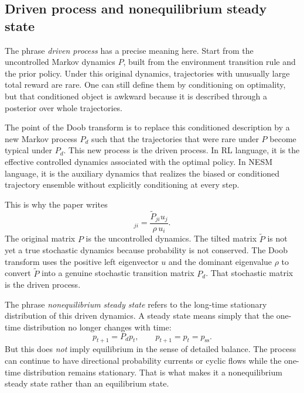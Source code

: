 \documentclass[11pt]{article}
\begin{document}
\subsection*{Driven process and nonequilibrium steady state}

The phrase \emph{driven process} has a precise meaning here. Start from the uncontrolled Markov
dynamics \(P\), built from the environment transition rule and the prior policy. Under this
original dynamics, trajectories with unusually large total reward are rare. One can still define
them by conditioning on optimality, but that conditioned object is awkward because it is
described through a posterior over whole trajectories.

The point of the Doob transform is to replace this conditioned description by a new Markov
process \(P_d\) such that the trajectories that were rare under \(P\) become typical under
\(P_d\). This new process is the driven process. In RL language, it is the effective controlled
dynamics associated with the optimal policy. In NESM language, it is the auxiliary dynamics that
realizes the biased or conditioned trajectory ensemble without explicitly conditioning at every
step.

This is why the paper writes
\begin{equation}
    [P_d]_{ji}
    =
    \frac{\widetilde P_{ji}u_j}{\rho\,u_i}.
\end{equation}
The original matrix \(P\) is the uncontrolled dynamics. The tilted matrix \(\widetilde P\) is
not yet a true stochastic dynamics because probability is not conserved. The Doob transform uses
the positive left eigenvector \(u\) and the dominant eigenvalue \(\rho\) to convert
\(\widetilde P\) into a genuine stochastic transition matrix \(P_d\). That stochastic matrix is
the driven process.

The phrase \emph{nonequilibrium steady state} refers to the long-time stationary distribution of
this driven dynamics. A steady state means simply that the one-time distribution no longer
changes with time:
\begin{equation}
    p_{t+1}=P_d p_t,
    \qquad
    p_{t+1}=p_t=p_{\mathrm{ss}}.
\end{equation}
But this does \emph{not} imply equilibrium in the sense of detailed balance. The process can
continue to have directional probability currents or cyclic flows while the one-time
distribution remains stationary. That is what makes it a nonequilibrium steady state rather than
an equilibrium state.
\end{document}
